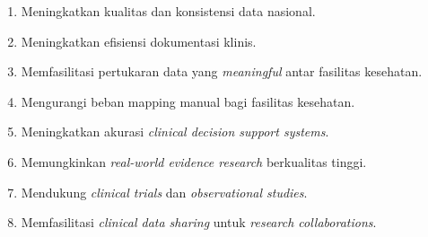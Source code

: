 \begin{enumerate}
    \item Meningkatkan kualitas dan konsistensi data nasional.
    \item Meningkatkan efisiensi dokumentasi klinis.
    \item Memfasilitasi pertukaran data yang \textit{meaningful} antar fasilitas kesehatan.
    \item Mengurangi beban mapping manual bagi fasilitas kesehatan.
    \item Meningkatkan akurasi \textit{clinical decision support systems}.
    \item Memungkinkan \textit{real-world evidence research} berkualitas tinggi.
    \item Mendukung \textit{clinical trials} dan \textit{observational studies}.
    \item Memfasilitasi \textit{clinical data sharing} untuk \textit{research collaborations}.
\end{enumerate}